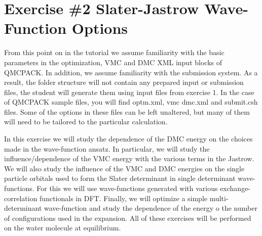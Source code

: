 \section{Exercise \#2 Slater-Jastrow Wave-Function Options}
From this point on in the tutorial we assume familiarity with the basic parameters in the
optimization, VMC and DMC XML input blocks of QMCPACK. In addition, we assume
familiarity with the submission system. As a result, the folder structure will not contain
any prepared input or submission files, the student will generate them using 
input files from exercise 1. In the case of QMCPACK sample 
files, you will find optm.xml, vmc dmc.xml and submit.csh files. Some of
the options in these files can be left unaltered, but many of them will need to be tailored to
the particular calculation.

In this exercise we will study the dependence of the DMC energy on the choices made
in the wave-function ansatz. In particular, we will study the influence/dependence of the
VMC energy with the various terms in the Jastrow. We will also study the influence of
the VMC and DMC energies on the single particle orbitals used to form the Slater determinant 
in single determinant wave-functions. For this we will use wave-functions generated
with various exchange-correlation functionals in DFT. Finally, we will optimize a simple
multi-determinant wave-function and study the dependence of the energy o the number of
configurations used in the expansion. All of these exercises will be performed on the water 
molecule at equilibrium.


